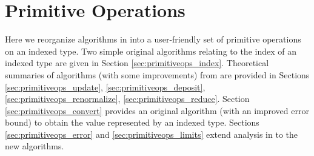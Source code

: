 \section{Primitive Operations}
    \label{sec:primitiveops}
    Here we reorganize algorithms in \cite{repsum} into a user-friendly set of
    primitive operations on an indexed type. Two simple original algorithms
    relating to the index of an indexed type are given in Section
    \ref{sec:primitiveops_index}. Theoretical summaries of algorithms (with
    some improvements) from \cite{repsum} are provided in Sections
    \ref{sec:primitiveops_update}, \ref{sec:primitiveops_deposit},
    \ref{sec:primitiveops_renormalize}, \ref{sec:primitiveops_reduce}. Section
    \ref{sec:primitiveops_convert} provides an original algorithm (with an
    improved error bound) to obtain the value represented by an indexed type.
    Sections \ref{sec:primitiveops_error} and \ref{sec:primitiveops_limits}
    extend analysis in \cite{repsum} to the new algorithms.

    
    
    
    
    
    
    
    
    

